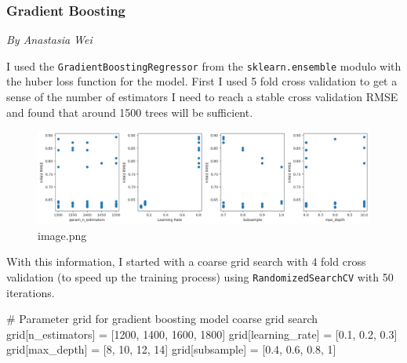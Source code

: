\documentclass[
  letterpaper,
  DIV=11,
  numbers=noendperiod]{scrartcl}
\newenvironment{Shaded}{\begin{snugshade}}{\end{snugshade}}
\newcommand{\CommentTok}[1]{\textcolor[rgb]{0.37,0.37,0.37}{#1}}
\newcommand{\DecValTok}[1]{\textcolor[rgb]{0.68,0.00,0.00}{#1}}
\newcommand{\FloatTok}[1]{\textcolor[rgb]{0.68,0.00,0.00}{#1}}
\newcommand{\NormalTok}[1]{\textcolor[rgb]{0.00,0.23,0.31}{#1}}
\newcommand{\OperatorTok}[1]{\textcolor[rgb]{0.37,0.37,0.37}{#1}}
\newcommand{\StringTok}[1]{\textcolor[rgb]{0.13,0.47,0.30}{#1}}
\begin{document}
\hypertarget{gradient-boosting}{%
\subsubsection{Gradient Boosting}\label{gradient-boosting}}

\emph{By Anastasia Wei}

I used the \texttt{GradientBoostingRegressor} from the
\texttt{sklearn.ensemble} modulo with the huber loss function for the
model. First I used 5 fold cross validation to get a sense of the number
of estimators I need to reach a stable cross validation RMSE and found
that around 1500 trees will be sufficient.

\begin{figure}

{\centering \includegraphics{Project_Report_Saturn_files/figure-pdf/image.png}

}

\caption{image.png}

\end{figure}

With this information, I started with a coarse grid search with 4 fold
cross validation (to speed up the training process) using
\texttt{RandomizedSearchCV} with 50 iterations.

\begin{Shaded}
\begin{Highlighting}[]
\CommentTok{\# Parameter grid for gradient boosting model coarse grid search}
\NormalTok{grid[}\StringTok{\textquotesingle{}n\_estimators\textquotesingle{}}\NormalTok{] }\OperatorTok{=}\NormalTok{ [}\DecValTok{1200}\NormalTok{, }\DecValTok{1400}\NormalTok{, }\DecValTok{1600}\NormalTok{, }\DecValTok{1800}\NormalTok{]}
\NormalTok{grid[}\StringTok{\textquotesingle{}learning\_rate\textquotesingle{}}\NormalTok{] }\OperatorTok{=}\NormalTok{ [}\FloatTok{0.1}\NormalTok{, }\FloatTok{0.2}\NormalTok{, }\FloatTok{0.3}\NormalTok{]}
\NormalTok{grid[}\StringTok{\textquotesingle{}max\_depth\textquotesingle{}}\NormalTok{] }\OperatorTok{=}\NormalTok{ [}\DecValTok{8}\NormalTok{, }\DecValTok{10}\NormalTok{, }\DecValTok{12}\NormalTok{, }\DecValTok{14}\NormalTok{]}
\NormalTok{grid[}\StringTok{\textquotesingle{}subsample\textquotesingle{}}\NormalTok{] }\OperatorTok{=}\NormalTok{ [}\FloatTok{0.4}\NormalTok{, }\FloatTok{0.6}\NormalTok{, }\FloatTok{0.8}\NormalTok{, }\DecValTok{1}\NormalTok{]}
\end{Highlighting}
\end{Shaded}
\end{document}
